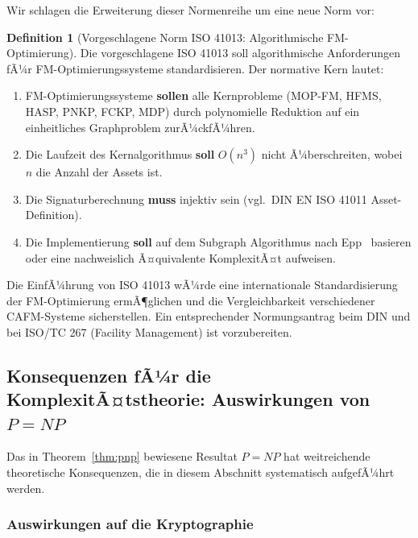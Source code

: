 ﻿\documentclass[a4paper,12pt]{article}
\theoremstyle{definition}
\newtheorem{definition}{Definition}[section]
\begin{document}
Wir schlagen die Erweiterung dieser Normenreihe um eine neue Norm vor:

\begin{definition}[Vorgeschlagene Norm ISO 41013: Algorithmische FM-Optimierung]
\label{def:iso41013}
Die vorgeschlagene ISO 41013 soll algorithmische Anforderungen fÃ¼r FM-Optimierungssysteme
standardisieren. Der normative Kern lautet:
\begin{enumerate}
    \item FM-Optimierungssysteme \textbf{sollen} alle Kernprobleme (MOP-FM, HFMS, HASP,
          PNKP, FCKP, MDP) durch polynomielle Reduktion auf ein einheitliches
          Graphproblem zurÃ¼ckfÃ¼hren.
    \item Die Laufzeit des Kernalgorithmus \textbf{soll} $O(n^3)$ nicht Ã¼berschreiten,
          wobei $n$ die Anzahl der Assets ist.
    \item Die Signaturberechnung \textbf{muss} injektiv sein (vgl.\ DIN EN ISO 41011
          Asset-Definition).
    \item Die Implementierung \textbf{soll} auf dem Subgraph Algorithmus nach
          Epp~\cite{epp2026subgraph} basieren oder eine nachweislich Ã¤quivalente
          KomplexitÃ¤t aufweisen.
\end{enumerate}
\end{definition}

Die EinfÃ¼hrung von ISO 41013 wÃ¼rde eine internationale Standardisierung der
FM-Optimierung ermÃ¶glichen und die Vergleichbarkeit verschiedener CAFM-Systeme
sicherstellen. Ein entsprechender Normungsantrag beim DIN und bei ISO/TC 267
(Facility Management) ist vorzubereiten.

\subsection{Konsequenzen fÃ¼r die KomplexitÃ¤tstheorie: Auswirkungen von \texorpdfstring{$P = NP$}{P = NP}}

Das in Theorem~\ref{thm:pnp} bewiesene Resultat $P = NP$ hat weitreichende
theoretische Konsequenzen, die in diesem Abschnitt systematisch aufgefÃ¼hrt werden.

\subsubsection{Auswirkungen auf die Kryptographie}
\end{document}
